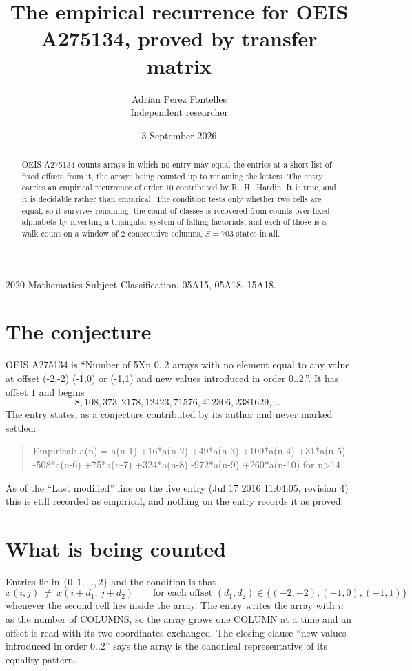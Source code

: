 \documentclass[11pt,a4paper]{article}
\title{The empirical recurrence for OEIS A275134, proved by transfer matrix}
\author{Adrian Perez Fontelles\\ \small Independent researcher}
\date{3 September 2026}
\theoremstyle{plain}
\theoremstyle{definition}
\begin{document}
\maketitle

\begin{abstract}
OEIS A275134 counts arrays in which no entry may equal the entries at a short list of fixed offsets
from it, the arrays being counted up to renaming the letters. The entry carries an empirical
recurrence of order $10$ contributed by R.~H.~Hardin. It is true, and it is decidable
rather than empirical. The condition tests only whether two cells are equal, so it survives
renaming; the count of classes is recovered from counts over fixed alphabets by inverting a
triangular system of falling factorials, and each of those is a walk count on a window of
$2$ consecutive columns, $S=703$ states in all.
\end{abstract}

\noindent\small 2020 Mathematics Subject Classification. 05A15, 05A18, 15A18.\normalsize

\section{The conjecture}

OEIS A275134 is ``Number of 5Xn 0..2 arrays with no element equal to any value at offset (-2,-2) (-1,0) or (-1,1) and new values introduced in order 0..2.''. It has offset $1$ and begins
\[
8, 108, 373, 2178, 12423, 71576, 412306, 2381629,\ \dots
\]
The entry states, as a conjecture contributed by its author and never marked settled:
\begin{quote}
Empirical: a(n) = a(n-1) +16*a(n-2) +49*a(n-3) +109*a(n-4) +31*a(n-5) -508*a(n-6) +75*a(n-7) +324*a(n-8) -972*a(n-9) +260*a(n-10) for n>14
\end{quote}
As of the ``Last modified'' line on the live entry (Jul 17 2016 11:04:05, revision 4) this is still
recorded as empirical, and nothing on the entry records it as proved.

\section{What is being counted}

Entries lie in $\{0,1,\dots,2\}$ and the condition is that
\[
x(i,j)\ \ne\ x(i+d_1,\,j+d_2)\qquad\text{for each offset }(d_1,d_2)\in\{(-2,-2), (-1,0), (-1,1)\}
\]
whenever the second cell lies inside the array. The entry writes the array with $n$ as the number of COLUMNS, so the array grows one COLUMN at a time and an offset is read with its two coordinates exchanged. The closing clause ``new values
introduced in order $0..2$'' says the array is the canonical representative of its equality
pattern.
\end{document}
